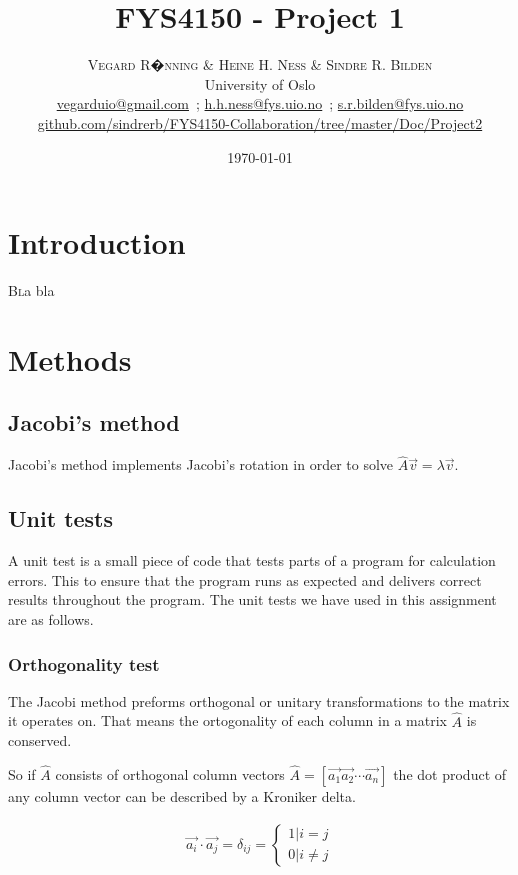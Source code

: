 \documentclass[twoside,twocolumn]{article}
\title{FYS4150 - Project 1} %
\author{%
\textsc{Vegard R�nning \& Heine H. Ness \& Sindre R. Bilden} \\[1ex] %
\normalsize University of Oslo \\ %
\normalsize \href{mailto:vegarduio@gmail.com}{vegarduio@gmail.com}\ ; \href{mailto:h.h.ness@fys.uio.no}{h.h.ness@fys.uio.no}\ ; \href{mailto:s.r.bilden@fys.uio.no}{s.r.bilden@fys.uio.no}\\%
\footnotesize \href{https://github.com/sindrerb/FYS4150-Collaboration/tree/master/Doc/Project2}{github.com/sindrerb/FYS4150-Collaboration/tree/master/Doc/Project2}
}
\date{\today} %
\newcommand{\nl}{

\medskip
\noindent
}
\begin{document}
\maketitle


\section{Introduction}
\lettrine[nindent=0em,lines=3]{B}la bla

\section{Methods}
\subsection{Jacobi's method}
Jacobi's method implements Jacobi's rotation in order to solve $\hat{A}\vec v=\lambda \vec v$. 


\subsection{Unit tests}

A unit test is a small piece of code that tests parts of a program for calculation errors. This to ensure that the program runs as expected and delivers correct results throughout the program. The unit tests we have used in this assignment are as follows.

\subsubsection{Orthogonality test}

The Jacobi method preforms orthogonal or unitary transformations to the matrix it operates on. That means the ortogonality of each column in a matrix $\hat{A}$ is conserved. 
\nl
So if $\hat{A}$ consists of orthogonal column vectors $\hat{A} = [\vec{a_1} \vec{a_2} \cdots \vec{a_n}  ]$ the dot product of any column vector can be described by a Kroniker delta.

\begin{align*}
    \vec{a_i}\cdot\vec{a_j} = \delta_{ij} =
    \begin{cases}
    1|i=j\\
    0|i\neq j
    \end{cases}
\end{align*}
\end{document}
